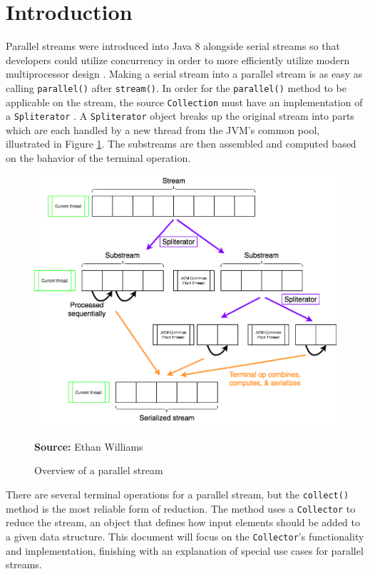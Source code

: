 \documentclass[oneside, 12pt]{article}
\newcommand{\source}[1]{\textbf{Source:} {#1} }
\begin{document}
\section{Introduction}
Parallel streams were introduced into Java 8 alongside serial streams so that developers could utilize concurrency in order to more efficiently utilize modern multiprocessor design \autocite{ibm_streams}. Making a serial stream into a parallel stream is as easy as calling \verb|parallel()| after \verb|stream()|. In order for the \verb|parallel()| method to be applicable on the stream, the source \verb|Collection| must have an implementation of a \verb|Spliterator| \autocite{ibm_streams}. A \verb|Spliterator| object breaks up the original stream into parts which are each handled by a new thread from the JVM's common pool, illustrated in Figure \ref{fig:overview}. The substreams are then assembled and computed based on the bahavior of the terminal operation.

\begin{figure}[H]
\centering
\includegraphics[width=13cm]{../images/overview.png}
\caption{Overview of a parallel stream}
\source{Ethan Williams}
\label{fig:overview}
\end{figure}

There are several terminal operations for a parallel stream, but the \verb|collect()| method is the most reliable form of reduction. The method uses a \verb|Collector| to reduce the stream, an object that defines how input elements should be added to a given data structure. This document will focus on the \verb|Collector|'s functionality and implementation, finishing with an explanation of special use cases for parallel streams.
\end{document}
